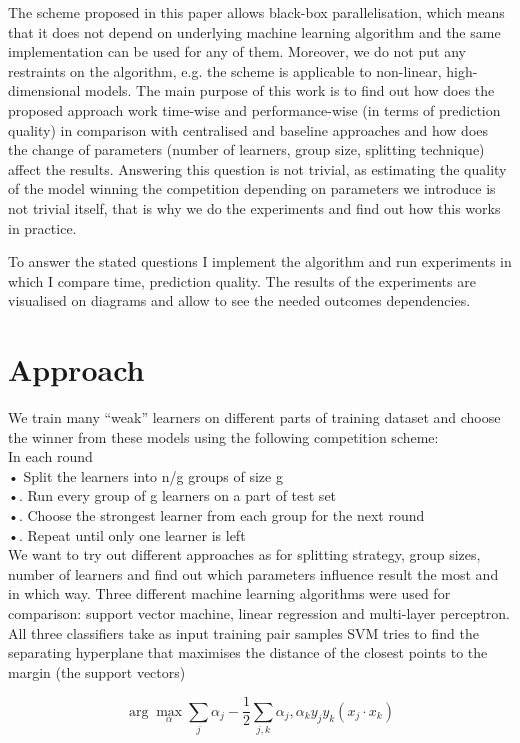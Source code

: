 \documentclass{scrartcl}
\begin{document}
The scheme proposed in this paper allows black-box parallelisation, which means that it does not depend on underlying machine learning algorithm and the same implementation can be used for any of them. Moreover, we do not put any restraints on the algorithm, e.g. the scheme is applicable to non-linear, high-dimensional models. 
The main purpose of this work is to find out how does the proposed approach work time-wise and performance-wise (in terms of prediction quality) in comparison with centralised and baseline approaches and how does the change of parameters (number of learners, group size, splitting technique) affect the results. 
Answering this question is not trivial, as estimating the quality of the model winning the competition depending on parameters we introduce is not trivial itself, that is why we do the experiments and find out how this works in practice. 

To answer the stated questions I implement the algorithm and run experiments in which I compare time, prediction quality. The results of the experiments are visualised on diagrams and allow to see the needed outcomes dependencies.


\section{Approach}
We train many “weak” learners on different parts of training dataset and choose the winner from these models using the following competition scheme:\\
In each round\\
•   Split the learners into n/g groups of size g\\
•.  Run every group of g learners on a part of test set\\
•.  Choose the strongest learner from each group for the next round\\
•.  Repeat until only one learner is left\\
We want to try out different approaches as for splitting strategy, group sizes, number of learners and find out which parameters influence result the most and in which way.
Three different machine learning algorithms were used for comparison: support vector machine, linear regression and multi-layer perceptron. 
All three classifiers take as input training pair samples 
SVM 
tries to find the separating hyperplane that maximises the distance of the closest points to the margin (the support vectors)


\begin{equation}
\arg\max_\alpha \sum_j \alpha_j - \frac{1}{2} \sum_{j,k} \alpha_j, \alpha_k y_j y_k (x_j \cdot x_k)
\label{eqn:svm:maxmarg}
\end{equation}
\end{document}
